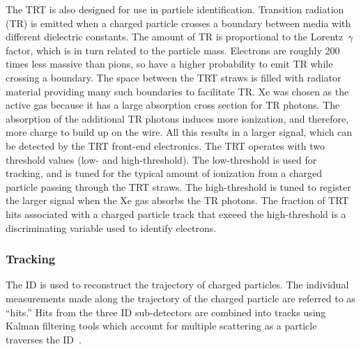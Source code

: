 The TRT is also designed for use in particle identification.
Transition radiation (TR) is emitted when a charged particle crosses a boundary
between media with different dielectric constants.
The amount of TR is proportional to the Lorentz~$\gamma$ factor, which is in
turn related to the particle mass.
Electrons are roughly 200 times less massive than pions, so have a higher
probability to emit TR while crossing a boundary.
The space between the TRT straws is filled with radiator material providing
many such boundaries to facilitate TR.
Xe was chosen as the active gas because it has a large absorption cross section
for TR photons.
The absorption of the additional TR photons induces more ionization, and
therefore, more charge to build up on the wire.
All this results in a larger signal, which can be detected by the TRT
front-end electronics.
The TRT operates with two threshold values (low- and high-threshold).
The low-threshold is used for tracking, and is tuned for the typical amount of
ionization from a charged particle passing through the TRT straws.
The high-threshold is tuned to register the larger signal when the Xe gas
absorbs the TR photons.
The fraction of TRT hits associated with a charged particle track that exceed
the high-threshold is a discriminating variable used to identify electrons.

\FloatBarrier
\subsubsection{Tracking} 
\label{sec:tracking}

The ID is used to reconstruct the trajectory of charged particles.
The individual measurements made along the trajectory of the charged particle
are referred to as ``hits.''
Hits from the three ID sub-detectors are combined into tracks using Kalman
filtering tools which account for multiple scattering as a particle traverses
the ID~\cite{ATLAS-CONF-2014-047,ATLAS-CONF-2012-042}.

